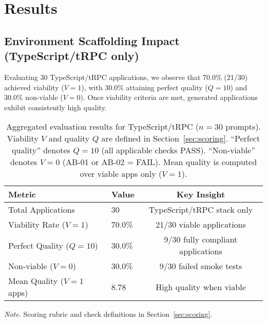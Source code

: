 \documentclass{article}
\begin{document}
\section{Results}

\subsection{Environment Scaffolding Impact (TypeScript/tRPC only)}

Evaluating 30 TypeScript/tRPC applications, we observe that 70.0\% (21/30) achieved viability ($V=1$), with 30.0\% attaining perfect quality ($Q=10$) and 30.0\% non-viable ($V=0$). Once viability criteria are met, generated applications exhibit consistently high quality.

\begin{table}[t]
\caption{Aggregated evaluation results for TypeScript/tRPC ($n=30$ prompts). Viability $V$ and quality $Q$ are defined in Section~\ref{sec:scoring}. ``Perfect quality'' denotes $Q=10$ (all applicable checks PASS). ``Non-viable'' denotes $V=0$ (AB-01 or AB-02 = FAIL). Mean quality is computed over viable apps only ($V=1$).}
\label{tab:aggregated-results}
\centering
\begin{threeparttable}
\begin{tabular}{llc}
\toprule
Metric & Value & Key Insight \\
\midrule
Total Applications & 30 & TypeScript/tRPC stack only \\
Viability Rate ($V=1$) & 70.0\% & 21/30 viable applications \\
Perfect Quality ($Q=10$) & 30.0\% & 9/30 fully compliant applications \\
Non-viable ($V=0$) & 30.0\% & 9/30 failed smoke tests \\
Mean Quality ($V=1$ apps) & 8.78 & High quality when viable \\
\bottomrule
\end{tabular}
\begin{tablenotes}
\item \textit{Note.} Scoring rubric and check definitions in Section~\ref{sec:scoring}.
\end{tablenotes}
\end{threeparttable}
\end{table}
\end{document}
